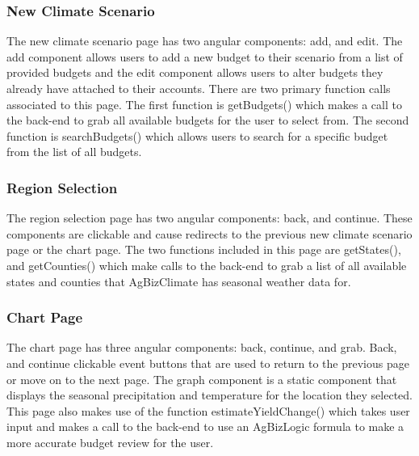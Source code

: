\documentclass[onecolumn, draftclsnofoot,10pt, compsoc]{article}
\begin{document}
		\subsubsection{New Climate Scenario}
		The new climate scenario page has two angular components: add, and edit. The add component allows users to add a new budget to their scenario from a list of provided budgets and the edit component allows users to alter budgets they already have attached to their accounts. There are two primary function calls associated to this page. The first function is getBudgets() which makes a call to the back-end to grab all available budgets for the user to select from. The second function is searchBudgets() which allows users to search for a specific budget from the list of all budgets.\\
		
		\subsubsection{Region Selection}
		 The region selection page has two angular components: back, and continue. These components are clickable and cause redirects to the previous new climate scenario page or the chart page. The two functions included in this page are getStates(), and getCounties() which make calls to the back-end to grab a list of all available states and counties that AgBizClimate has seasonal weather data for.\\
		
		\subsubsection{Chart Page}
		The chart page has three angular components: back, continue, and grab. Back, and continue clickable event buttons that are used to return to the previous page or move on to the next page. The graph component is a static component that displays the seasonal precipitation and temperature for the location they selected. This page also makes use of the function estimateYieldChange() which takes user input and makes a call to the back-end to use an AgBizLogic formula to make a more accurate budget review for the user.\\
		
\end{document}
